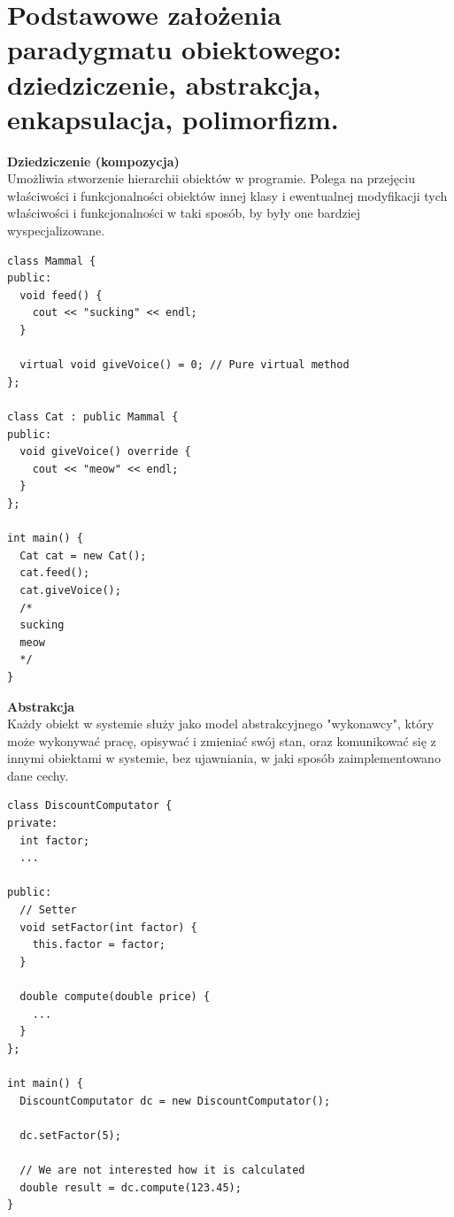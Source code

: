 \documentclass[12pt]{article}
\begin{document}
    \section{Podstawowe założenia paradygmatu obiektowego: dziedziczenie, abstrakcja, enkapsulacja, polimorfizm.}
    \begin{definition}
	\textbf{Dziedziczenie (kompozycja)} \\
    	Umożliwia stworzenie hierarchii obiektów w programie. Polega na przejęciu właściwości i funkcjonalności obiektów innej klasy
    	i ewentualnej modyfikacji tych właściwości i funkcjonalności w taki sposób, by były one bardziej wyspecjalizowane.
    	\begin{verbatim}
class Mammal {
public:
  void feed() {
    cout << "sucking" << endl;
  }
		
  virtual void giveVoice() = 0; // Pure virtual method
};

class Cat : public Mammal {
public:
  void giveVoice() override {
    cout << "meow" << endl;
  }
};

int main() {
  Cat cat = new Cat();
  cat.feed();
  cat.giveVoice();
  /*
  sucking
  meow
  */
}
    	\end{verbatim}
    \end{definition}
    
    \begin{definition}
    \textbf{Abstrakcja} \\
    Każdy obiekt w systemie służy jako model abstrakcyjnego "wykonawcy", który może wykonywać pracę, opisywać i zmieniać swój stan, oraz komunikować się
    z innymi obiektami w systemie, bez ujawniania, w jaki sposób zaimplementowano dane cechy.
    \begin{verbatim}
class DiscountComputator {
private:
  int factor;
  ...

public:  
  // Setter
  void setFactor(int factor) {
    this.factor = factor;
  }
  
  double compute(double price) {
    ...
  }
};

int main() {
  DiscountComputator dc = new DiscountComputator();
  
  dc.setFactor(5);
  
  // We are not interested how it is calculated
  double result = dc.compute(123.45);
}
    \end{verbatim}
    \end{definition}
    
\end{document}
